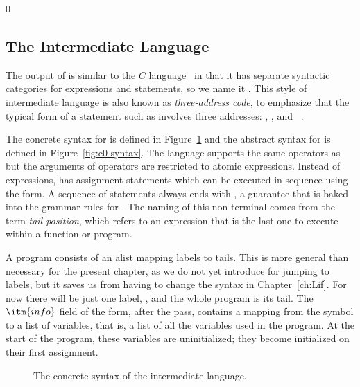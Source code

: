 \documentclass[7x10,nocrop]{TimesAPriori_MIT}%
\def\racketEd{0}
\def\edition{0}
\begin{document}
{\if\edition\racketEd  
\subsection{The \LangCVar{} Intermediate Language}

The output of  is similar to the $C$
language~\citep{Kernighan:1988nx} in that it has separate syntactic
categories for expressions and statements, so we name it \LangCVar{}.
This style of intermediate language is also known as
\emph{three-address code}, to emphasize that the typical form of a
statement such as  involves three
addresses: , , and ~\citep{Aho:2006wb}.

The concrete syntax for \LangCVar{} is defined in
Figure~\ref{fig:c0-concrete-syntax} and the abstract syntax for
\LangCVar{} is defined in Figure~\ref{fig:c0-syntax}.
%
The \LangCVar{} language supports the same operators as \LangVar{} but
the arguments of operators are restricted to atomic
expressions. Instead of  expressions, \LangCVar{} has
assignment statements which can be executed in sequence using the
 form. A sequence of statements always ends with
, a guarantee that is baked into the grammar rules for
. The naming of this non-terminal comes from the term
\emph{tail position}, which refers to an
expression that is the last one to execute within a function or
program.

A \LangCVar{} program consists of an alist mapping labels to
tails. This is more general than necessary for the present chapter, as
we do not yet introduce  for jumping to labels, but it saves
us from having to change the syntax in Chapter~\ref{ch:Lif}.  For now
there will be just one label, , and the whole program is
its tail.
%
The $\itm{info}$ field of the  form, after the
 pass, contains a mapping from the symbol
 to a list of variables, that is, a list of all the
variables used in the program. At the start of the program, these
variables are uninitialized; they become initialized on their first
assignment.

\begin{figure}[tbp]
\caption{The concrete syntax of the \LangCVar{} intermediate language.}
\label{fig:c0-concrete-syntax}
\end{figure}


}
\end{document}
